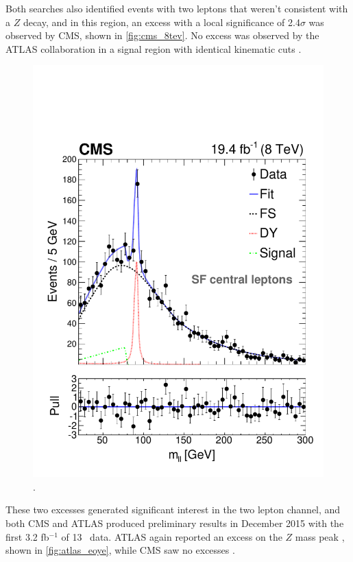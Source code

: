 Both searches also identified events with two leptons that weren't consistent with a $Z$ decay, and in this region, an excess with a local significance of 2.4$\sigma$ was observed by \ac{CMS}, shown in \autoref{fig:cms_8tev}. No excess was observed by the ATLAS collaboration in a signal region with identical kinematic cuts \cite{SUSY-2014-10}. 

\begin{centering}
\begin{figure}[!hbt]
\myfloatalign
\includegraphics[width=.9\linewidth]{figures/theory/H1_FIT_SF_CE.pdf}
\caption{ \cite{CMS2}.}
\label{fig:cms_8tev}
\end{figure}
\end{centering}

These two excesses generated significant interest in the two lepton channel, and both \ac{CMS} and ATLAS produced preliminary results in December 2015 with the first 3.2 fb$^{-1}$ of 13 \tev~data. ATLAS again reported an excess on the $Z$ mass peak \cite{ATLAS-CONF-2015-082}, shown in \autoref{fig:atlas_eoye}, while \ac{CMS} saw no excesses \cite{CMS-PAS-SUS-15-011}. 


